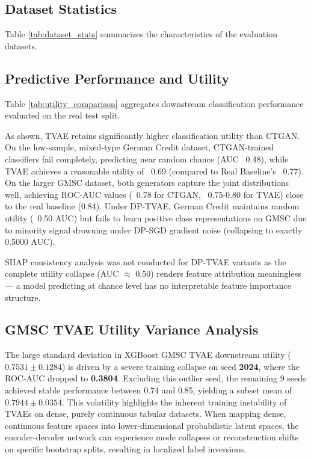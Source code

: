 \documentclass[journal]{IEEEtran}
\begin{document}
\subsection{Dataset Statistics}
Table \ref{tab:dataset_stats} summarizes the characteristics of the evaluation datasets.



\subsection{Predictive Performance and Utility}
Table \ref{tab:utility_comparison} aggregates downstream classification performance evaluated on the real test split.



As shown, TVAE retains significantly higher classification utility than CTGAN. On the low-sample, mixed-type German Credit dataset, CTGAN-trained classifiers fail completely, predicting near random chance (AUC ~0.48), while TVAE achieves a reasonable utility of ~0.69 (compared to Real Baseline's ~0.77). On the larger GMSC dataset, both generators capture the joint distributions well, achieving ROC-AUC values (~0.78 for CTGAN, ~0.75-0.80 for TVAE) close to the real baseline (0.84). Under DP-TVAE, German Credit maintains random utility (~0.50 AUC) but fails to learn positive class representations on GMSC due to minority signal drowning under DP-SGD gradient noise (collapsing to exactly 0.5000 AUC).

SHAP consistency analysis was not conducted for DP-TVAE variants as the complete utility collapse (AUC $\approx$ 0.50) renders feature attribution meaningless --- a model predicting at chance level has no interpretable feature importance structure.

\subsection{GMSC TVAE Utility Variance Analysis}
The large standard deviation in XGBoost GMSC TVAE downstream utility ($0.7531 \pm 0.1284$) is driven by a severe training collapse on seed \textbf{2024}, where the ROC-AUC dropped to \textbf{0.3804}. Excluding this outlier seed, the remaining 9 seeds achieved stable performance between 0.74 and 0.85, yielding a subset mean of $0.7944 \pm 0.0354$. This volatility highlights the inherent training instability of TVAEs on dense, purely continuous tabular datasets. When mapping dense, continuous feature spaces into lower-dimensional probabilistic latent spaces, the encoder-decoder network can experience mode collapses or reconstruction shifts on specific bootstrap splits, resulting in localized label inversions.
\end{document}
